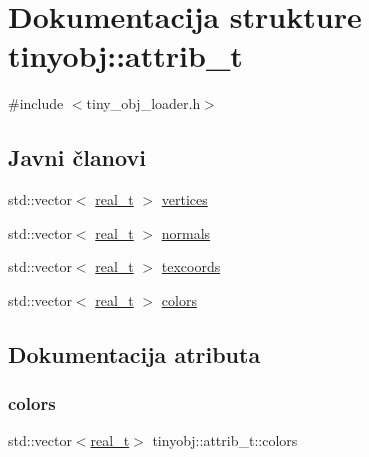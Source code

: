\hypertarget{structtinyobj_1_1attrib__t}{}\section{Dokumentacija strukture tinyobj\+:\+:attrib\+\_\+t}
\label{structtinyobj_1_1attrib__t}


{\ttfamily \#include $<$tiny\+\_\+obj\+\_\+loader.\+h$>$}

\subsection*{Javni članovi}
\begin{DoxyCompactItemize}
\item 
std\+::vector$<$ \hyperlink{namespacetinyobj_ad5ca7469ff56bf0d8423120cfd99adce}{real\+\_\+t} $>$ \hyperlink{structtinyobj_1_1attrib__t_a1c79c00f3baa0888a5efcfc68a4d419e}{vertices}
\item 
std\+::vector$<$ \hyperlink{namespacetinyobj_ad5ca7469ff56bf0d8423120cfd99adce}{real\+\_\+t} $>$ \hyperlink{structtinyobj_1_1attrib__t_ac647590e9a03bec3c6cee5c215781e12}{normals}
\item 
std\+::vector$<$ \hyperlink{namespacetinyobj_ad5ca7469ff56bf0d8423120cfd99adce}{real\+\_\+t} $>$ \hyperlink{structtinyobj_1_1attrib__t_aad958a1ea44377cfd3dd007d3b15d887}{texcoords}
\item 
std\+::vector$<$ \hyperlink{namespacetinyobj_ad5ca7469ff56bf0d8423120cfd99adce}{real\+\_\+t} $>$ \hyperlink{structtinyobj_1_1attrib__t_aad0a3d4f2e6f1ff89671dd3d4b2dff2e}{colors}
\end{DoxyCompactItemize}


\subsection{Dokumentacija atributa}
\mbox{\label{structtinyobj_1_1attrib__t_aad0a3d4f2e6f1ff89671dd3d4b2dff2e}} 
\subsubsection{\texorpdfstring{colors}{colors}}
{\footnotesize\ttfamily std\+::vector$<$\hyperlink{namespacetinyobj_ad5ca7469ff56bf0d8423120cfd99adce}{real\+\_\+t}$>$ tinyobj\+::attrib\+\_\+t\+::colors}

